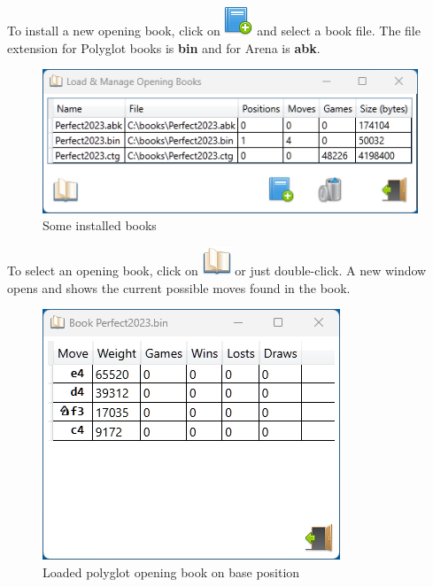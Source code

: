 \documentclass[11pt,a4paper]{article}
\begin{document}
	To install a new opening book, click on \includegraphics[scale=0.5]{book_add.png} and select a book file. The file extension for Polyglot books is \textbf{bin} and for Arena is \textbf{abk}.
	
	\begin{figure}[H]
		\centering
		\includegraphics[scale=1.0]{LoadManageBooks3.png}
		\caption{Some installed books }
		\label{fig:LoadManageBooks3}
	\end{figure}
	
	To select an opening book, click on \includegraphics[scale=0.5]{book_open.png} or just double-click. 
	A new window opens and shows the current possible moves found in the book.
	
	\begin{figure}[H]
		\centering
		\includegraphics[scale=1.0]{OpeningBook.png}
		\caption{Loaded polyglot opening book on base position }
		\label{fig:OpeningBook}
	\end{figure}
	
\end{document}
